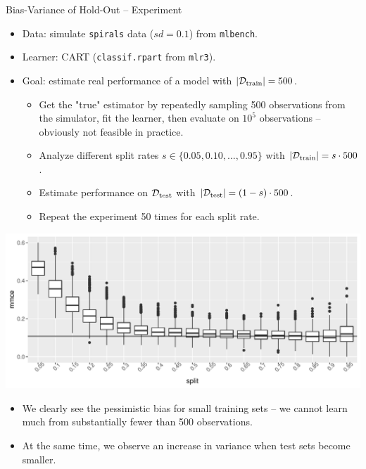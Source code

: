 
\begin{vbframe}{Bias-Variance of Hold-Out -- Experiment}

\begin{itemize}
  \item Data: simulate \texttt{spirals} data ($sd = 0.1$) from \texttt{mlbench}.
  \item Learner: CART (\texttt{classif.rpart} from \texttt{mlr3}).
  \item Goal: estimate real performance of a model with $|\mathcal{D}_{\text{train}}| = 500$.
  \begin{itemize}
    \item Get the "true" estimator by repeatedly sampling 500 observations from 
    the simulator, fit the learner, then evaluate on $10^5$ observations -- 
    obviously not feasible in practice.
    \item Analyze different split rates $s \in \{0.05, 0.10, ..., 0.95\}$ 
    with $|\mathcal{D}_{\text{train}}| = s \cdot 500$.
    \item Estimate performance on $\mathcal{D}_{\text{test}}$ with $|\mathcal{D}_{\text{test}}| = (1 - s) \cdot 500$.
    \item Repeat the experiment 50 times for each split rate.
  \end{itemize}
\end{itemize}

\framebreak


\includegraphics[width=\textwidth]{figure/test-holdout-example} 

\lz

\begin{itemize}
  \item We clearly see the pessimistic bias for small training sets -- we cannot 
  learn much from substantially fewer than 500 observations. 
  \item At the same time, we observe an increase in variance when test sets 
  become smaller.
\end{itemize}


\end{vbframe}
